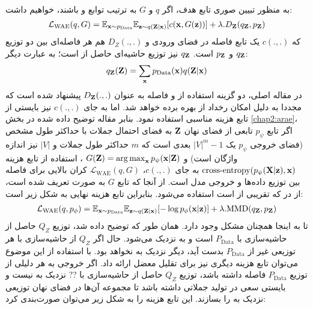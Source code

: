 \\
به منظور تبیین صوری تابع هدف، اگر $‎q‎$  و $G$ به ترتیب توابع \encoder{} و \decoder{} باشند، خواهیم داشت:
\begin{gather}
	\mathcal{L}_{\text{WAE}}(q, G) = \mathbb E_{{\bf x} \sim p_{\text{Data}}}\mathbb E_{{\bf z} \sim q({\bf Z}|{\bf x})} [c({\bf x}, G({\bf z}))] + \lambda . D_{\bf Z}(q_{\bf Z}, p_{\bf Z})
\end{gather}
که $c(.,.)$ یک تابع فاصله در فضای ورودی و  $D_Z(. , .)$ هم هر فاصله‌ای بین دو توزیع $q_{\bf Z}$ و $p_{\bf Z}$ است. $q_{\bf Z}$ نیز توزیع حاشیه‌ای حاصل از \encoder{} است؛ به عبارت دیگر:
\begin{gather}
	q_{\bf Z}({\bf Z}) = \sum_{\bf x} p_{\text{Data}}({\bf x}) q({\bf Z}|{\bf x})
\end{gather}
در مقاله اصلی، دو گزینه استفاده از \gan{} و فاصله \mmd{} به عنوان $D_{\bf Z}(.,.)$ پیشنهاد شده است که مجددا به دلیل امکان رخداد \modecollapse{} از \mmd{} بهره برده خواهد شد.
اما به جای $c(.,.)$ نیز بایستی از تابع هزینه مناسبی استفاده نمود. بنابر مقاله توضیح داده شده در بخش \ref{chap2:arae}، اگر تابع $p_\psi$ تابعی از فضای نهان ${\bf Z}$ به فضای احتمال جملات با حداکثر طول مشخص
(فضای خروجی $p_\psi$ یک
$|V|^m-1$
بعدی است که $m$ حداکثر طول جملات و $|V|$ نیز اندازه واژگان است) و
$G({\bf Z}) = \operatorname*{arg\,max}_{{\bf x}} p_\psi({\bf x}|{\bf Z})$
، استفاده از تابع هزینه
$\text{cross-entropy}(p_\psi({\bf X}|{\bf z}), {\bf x})$
به جای $c(.,.)$،
$\mathcal{L}_{\text{WAE}}(q, G)$
کران بالایی برای فاصله \wasser{} بین توزیع داده‌ها و خروجی مدل است. از آنجا که تابع $G$ به صورت \argmaxphrase{} تعریف شده است، از \greedydecoding{} در \decoder{} که تقریبی از \argmaxphrase{} است استفاده می‌شود.
بنابراین تابع هزینه نهایی به شکل زیر است:
\begin{gather}
	\mathcal{L}_{\text{WAE}}(q, p_\phi) = \mathbb E_{{\bf x} \sim p_{\text{Data}}}\mathbb E_{{\bf z} \sim q({\bf Z}|{\bf x})} [-\log p_\phi({\bf x}|{\bf z})] + \lambda . \text{MMD}(q_{\bf Z}, p_{\bf Z})
\end{gather}
\iffalse
تا به اینجا همچنان مشکل \expbias{} وجود دارد. همان طور که توضیح داده شد، توزیع $Q_Z$ حاصل از حاشیه‌سازی با $P_\text{Data}$ است و به \priordist{} نزدیک می‌شود. حال اگر $Q_Z$ از حاشیه‌سازی  با هر توزیعی غیر از $P_\text{Data}$ بدست آید، دیگر نزدیک به \priordist{} نخواهد بود. با استفاده از این موضوع می‌توان تابع هزینه دیگری نیز برای تقلیل معضل \expbias{} ارائه داد. اگر خروجی \decoder{} به هر دلیلی از توزیع $P_\text{Data}$ فاصله داشته باشد، توزیع $Q_Z$ حاصل از حاشیه‌سازی با ?? نزدیک به \priordist{} نیست و \decoder{} بایستی سعی در تولید جملاتی داشته باشد تا مجموعه آن‌ها در فضای نهان توزیعی نزدیک به \priordist{} را بسازند. این تابع هزینه را به شکل زیر می‌توان صورت‌بندی کرد:

